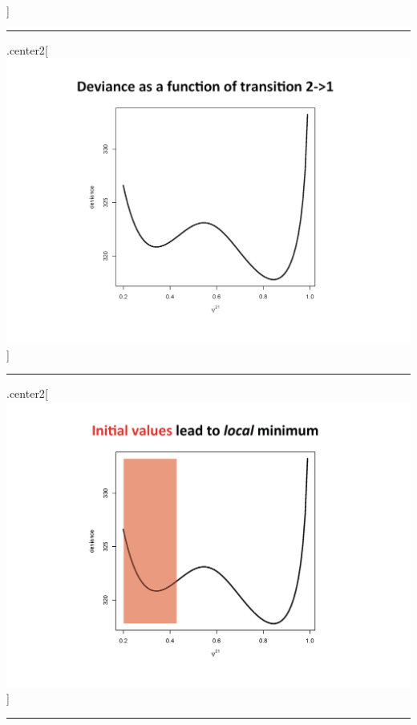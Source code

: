 \documentclass[
]{article}
\begin{document}
{]}

\begin{center}\rule{0.5\linewidth}{0.5pt}\end{center}

.center2{[}
\includegraphics{img/multistate_local_minimav2_Page_05.png}{]}

\begin{center}\rule{0.5\linewidth}{0.5pt}\end{center}

.center2{[}
\includegraphics{img/multistate_local_minimav2_Page_06.png}{]}

\begin{center}\rule{0.5\linewidth}{0.5pt}\end{center}
\end{document}
